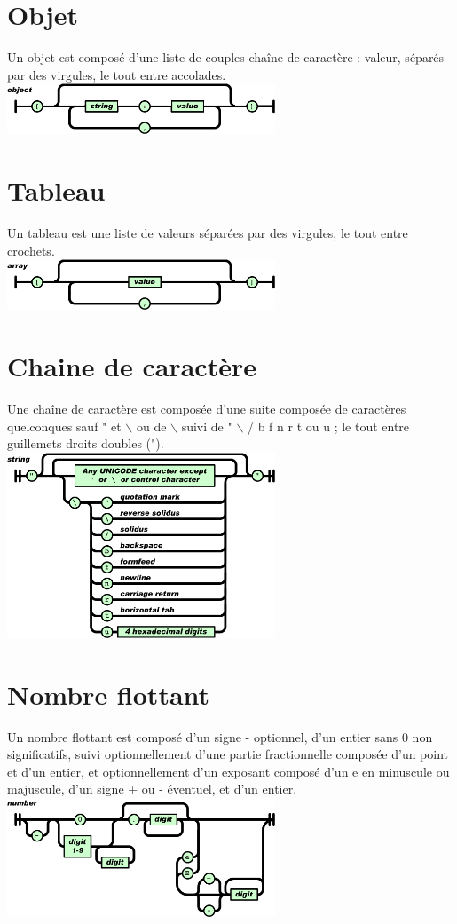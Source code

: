 \documentclass{report}
\begin{document}
\section{Objet}
Un objet est composé d’une liste de couples chaîne de caractère : valeur, séparés par des virgules, le tout entre accolades.
\\
\includegraphics[width=8cm]{object.png}

\section{Tableau}
Un tableau est une liste de valeurs séparées par des virgules, le tout entre crochets.
\\
\includegraphics[width=8cm]{array.png}

\section{Chaine de caractère}
Une chaîne de caractère est composée d’une suite composée de caractères quelconques sauf " et $\backslash$  ou de $\backslash$  suivi de " $\backslash$  / b f n r t ou u ; le tout entre guillemets droits doubles (").
\\
\includegraphics[width=8cm]{string.png}

\section{Nombre flottant}
Un nombre flottant est composé d’un signe - optionnel, d’un entier sans 0 non significatifs, suivi optionnellement d’une partie fractionnelle composée d’un point et d’un entier, et optionnellement d’un exposant composé d’un e en minuscule ou majuscule, d’un signe + ou - éventuel, et d’un entier.
\\
\includegraphics[width=8cm]{number.png}
\end{document}
